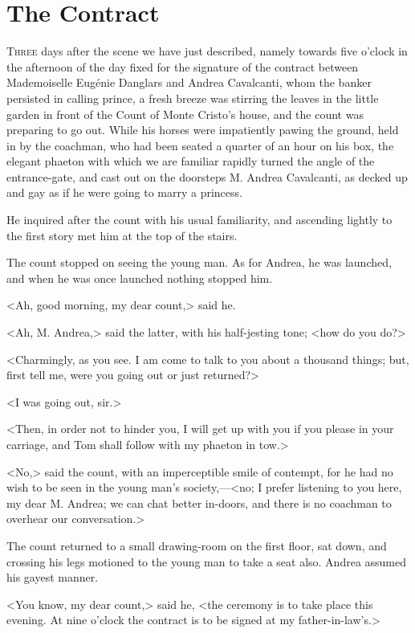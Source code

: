 \chapter{The Contract} 

 \lettrine{T}{hree} days after the scene we have just described, namely towards five o'clock in the afternoon of the day fixed for the signature of the contract between Mademoiselle Eugénie Danglars and Andrea Cavalcanti, whom the banker persisted in calling prince, a fresh breeze was stirring the leaves in the little garden in front of the Count of Monte Cristo's house, and the count was preparing to go out. While his horses were impatiently pawing the ground, held in by the coachman, who had been seated a quarter of an hour on his box, the elegant phaeton with which we are familiar rapidly turned the angle of the entrance-gate, and cast out on the doorsteps M. Andrea Cavalcanti, as decked up and gay as if he were going to marry a princess. 

 He inquired after the count with his usual familiarity, and ascending lightly to the first story met him at the top of the stairs. 

 The count stopped on seeing the young man. As for Andrea, he was launched, and when he was once launched nothing stopped him. 

 <Ah, good morning, my dear count,> said he. 

 <Ah, M. Andrea,> said the latter, with his half-jesting tone; <how do you do?> 

 <Charmingly, as you see. I am come to talk to you about a thousand things; but, first tell me, were you going out or just returned?> 

 <I was going out, sir.> 

 <Then, in order not to hinder you, I will get up with you if you please in your carriage, and Tom shall follow with my phaeton in tow.> 

 <No,> said the count, with an imperceptible smile of contempt, for he had no wish to be seen in the young man's society,—<no; I prefer listening to you here, my dear M. Andrea; we can chat better in-doors, and there is no coachman to overhear our conversation.> 

 The count returned to a small drawing-room on the first floor, sat down, and crossing his legs motioned to the young man to take a seat also. Andrea assumed his gayest manner. 

 <You know, my dear count,> said he, <the ceremony is to take place this evening. At nine o'clock the contract is to be signed at my father-in-law's.> 

